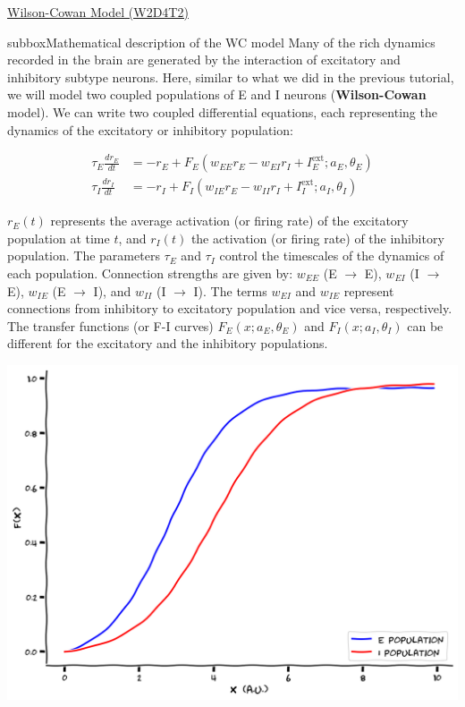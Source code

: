 \begin{textbox}{\href{https://compneuro.neuromatch.io/tutorials/W2D4_DynamicNetworks/chapter_title.html}{Wilson-Cowan Model (W2D4T2)} }
\begin{subbox}{subbox}{Mathematical description of the WC model}
\scriptsize
Many of the rich dynamics recorded in the brain are generated by the interaction of excitatory and inhibitory subtype neurons. Here, similar to what we did in the previous tutorial, we will model two coupled populations of E and I neurons (\textbf{Wilson-Cowan} model). We can write two coupled differential equations, each representing the dynamics of the excitatory or inhibitory population:

\begin{align*}
\tau_E \frac{dr_E}{dt} &= -r_E + F_E(w_{EE}r_E -w_{EI}r_I + I^{\text{ext}}_E;a_E,\theta_E)\\
\tau_I \frac{dr_I}{dt} &= -r_I + F_I(w_{IE}r_E -w_{II}r_I + I^{\text{ext}}_I;a_I,\theta_I)    
\end{align*}

$r_E(t)$ represents the average activation (or firing rate) of the excitatory population at time $t$, and $r_I(t)$ the activation (or firing rate) of the inhibitory population. The parameters $\tau_E$ and $\tau_I$ control the timescales of the dynamics of each population. Connection strengths are given by: $w_{EE}$ (E $\rightarrow$ E), $w_{EI}$ (I $\rightarrow$ E), $w_{IE}$ (E $\rightarrow$ I), and $w_{II}$ (I $\rightarrow$ I). The terms $w_{EI}$ and $w_{IE}$ represent connections from inhibitory to excitatory population and vice versa, respectively. The transfer functions (or F-I curves) $F_E(x;a_E,\theta_E)$ and $F_I(x;a_I,\theta_I)$ can be different for the excitatory and the inhibitory populations.
\begin{center}
\includegraphics[scale=0.28]{Figures/DN/DN_Figure5.png}
\end{center}
\end{subbox}

\end{textbox}
